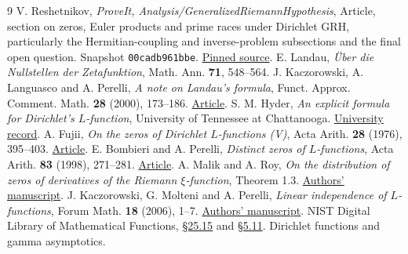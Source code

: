 \documentclass[11pt]{article}
\begin{document}
\begin{thebibliography}{9}
 V. Reshetnikov, \emph{ProveIt, Analysis/GeneralizedRiemannHypothesis}, Article, section on zeros, Euler products and prime races under Dirichlet GRH, particularly the Hermitian-coupling and inverse-problem subsections and the final open question. Snapshot \texttt{00cadb961bbe}. \href{https://github.com/VladimirReshetnikov/ProveIt/blob/00cadb961bbe77c74e5d082c4948f8884d58a970/Analysis/GeneralizedRiemannHypothesis/Article/sections/zer.tex}{Pinned source}.
 E. Landau, \emph{\"Uber die Nullstellen der Zetafunktion}, Math. Ann. \textbf{71}, 548--564.
 J. Kaczorowski, A. Languasco and A. Perelli, \emph{A note on Landau's formula}, Funct. Approx. Comment. Math. \textbf{28} (2000), 173--186. \href{https://doi.org/10.7169/facm/1538186693}{Article}.
 S. M. Hyder, \emph{An explicit formula for Dirichlet's $L$-function}, University of Tennessee at Chattanooga. \href{https://scholar.utc.edu/honors-theses/157/}{University record}.
 A. Fujii, \emph{On the zeros of Dirichlet $L$-functions (V)}, Acta Arith. \textbf{28} (1976), 395--403. \href{https://matwbn.icm.edu.pl/ksiazki/aa/aa28/aa2847.pdf}{Article}.
 E. Bombieri and A. Perelli, \emph{Distinct zeros of $L$-functions}, Acta Arith. \textbf{83} (1998), 271--281. \href{https://matwbn.icm.edu.pl/ksiazki/aa/aa83/aa8336.pdf}{Article}.
 A. Malik and A. Roy, \emph{On the distribution of zeros of derivatives of the Riemann $\xi$-function}, Theorem 1.3. \href{https://webpages.uncc.edu/aroy15/image/mr01.pdf}{Authors' manuscript}.
 J. Kaczorowski, G. Molteni and A. Perelli, \emph{Linear independence of $L$-functions}, Forum Math. \textbf{18} (2006), 1--7. \href{https://sites.unimi.it/molteni/research/papers-pdf/14-molteni-Linear_independence_of_L-functions.pdf}{Authors' manuscript}.
 NIST Digital Library of Mathematical Functions, \href{https://dlmf.nist.gov/25.15}{\S25.15} and \href{https://dlmf.nist.gov/5.11}{\S5.11}. Dirichlet functions and gamma asymptotics.
\end{thebibliography}
\end{document}
